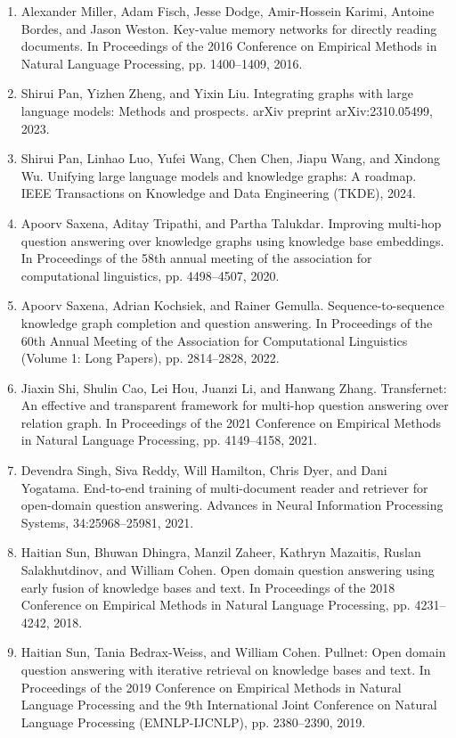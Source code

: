 \documentclass[11pt,UTF8,fontset=fandol]{ctexart}
\begin{document}
\begin{enumerate}[leftmargin=2em]
\item Alexander Miller, Adam Fisch, Jesse Dodge, Amir-Hossein Karimi, Antoine Bordes, and Jason Weston. Key-value memory networks for directly reading documents. In Proceedings of the 2016 Conference on Empirical Methods in Natural Language Processing, pp. 1400--1409, 2016.
\item Shirui Pan, Yizhen Zheng, and Yixin Liu. Integrating graphs with large language models: Methods and prospects. arXiv preprint arXiv:2310.05499, 2023.
\item Shirui Pan, Linhao Luo, Yufei Wang, Chen Chen, Jiapu Wang, and Xindong Wu. Unifying large language models and knowledge graphs: A roadmap. IEEE Transactions on Knowledge and Data Engineering (TKDE), 2024.
\item Apoorv Saxena, Aditay Tripathi, and Partha Talukdar. Improving multi-hop question answering over knowledge graphs using knowledge base embeddings. In Proceedings of the 58th annual meeting of the association for computational linguistics, pp. 4498--4507, 2020.
\item Apoorv Saxena, Adrian Kochsiek, and Rainer Gemulla. Sequence-to-sequence knowledge graph completion and question answering. In Proceedings of the 60th Annual Meeting of the Association for Computational Linguistics (Volume 1: Long Papers), pp. 2814--2828, 2022.
\item Jiaxin Shi, Shulin Cao, Lei Hou, Juanzi Li, and Hanwang Zhang. Transfernet: An effective and transparent framework for multi-hop question answering over relation graph. In Proceedings of the 2021 Conference on Empirical Methods in Natural Language Processing, pp. 4149--4158, 2021.
\item Devendra Singh, Siva Reddy, Will Hamilton, Chris Dyer, and Dani Yogatama. End-to-end training of multi-document reader and retriever for open-domain question answering. Advances in Neural Information Processing Systems, 34:25968--25981, 2021.
\item Haitian Sun, Bhuwan Dhingra, Manzil Zaheer, Kathryn Mazaitis, Ruslan Salakhutdinov, and William Cohen. Open domain question answering using early fusion of knowledge bases and text. In Proceedings of the 2018 Conference on Empirical Methods in Natural Language Processing, pp. 4231--4242, 2018.
\item Haitian Sun, Tania Bedrax-Weiss, and William Cohen. Pullnet: Open domain question answering with iterative retrieval on knowledge bases and text. In Proceedings of the 2019 Conference on Empirical Methods in Natural Language Processing and the 9th International Joint Conference on Natural Language Processing (EMNLP-IJCNLP), pp. 2380--2390, 2019.

\end{enumerate}
\end{document}
